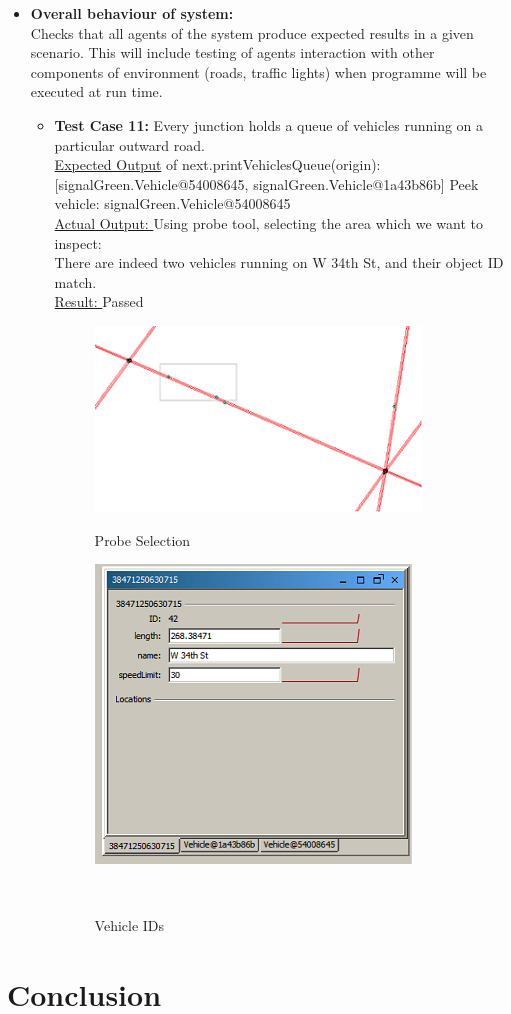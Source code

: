 \documentclass[11pt, oneside]{article}   	%
\begin{document}
\begin{itemize}
\item \textbf{Overall behaviour of system: }\hfill \\
		Checks that all agents of the system produce expected results in a given scenario. This will include testing of agents interaction with other components of environment (roads, traffic lights) when programme will be executed 		at run time.\hfill \\
	\begin{itemize}
	\item	\textbf{Test Case 11:} Every junction holds a queue of vehicles running on a particular outward road.\hfill \\
		\underline{Expected Output} of next.printVehiclesQueue(origin):[signalGreen.Vehicle@54008645, signalGreen.Vehicle@1a43b86b] Peek vehicle: signalGreen.Vehicle@54008645\hfill \\
		\underline{Actual Output: }Using probe tool, selecting the area which we want to inspect:\hfill \\
		There are indeed two vehicles running on W 34th St, and their object ID match.\hfill \\
		\underline{Result: }Passed
		\begin{figure}[h!]
		\centering
		\includegraphics{RoadNetwork}\hfill \\
		\caption{Probe Selection}
		\end{figure}

		\begin{figure}[h!]
		\centering
		\includegraphics{Sim}\hfill \\
		\caption{Vehicle IDs}\hfill \\
		\end{figure}
	\end{itemize}
\end{itemize}
\section{Conclusion}
\end{document}
